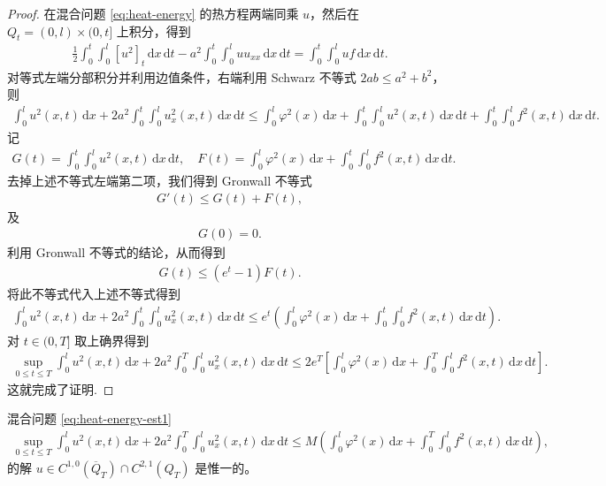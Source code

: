 \documentclass[../../main.tex]{subfiles}%
\begin{document}
\begin{proof}
在混合问题 \eqref{eq:heat-energy} 的热方程两端同乘 $u$，然后在 $Q_t=(0,l)\times(0,t]$ 上积分，得到
\begin{align*}
\frac{1}{2}\int_0^t\int_0^l [u^2]_t\,\mathrm{d}x\,\mathrm{d}t-a^2\int_0^t\int_0^l u u_{xx}\,\mathrm{d}x\,\mathrm{d}t=\int_0^t\int_0^l uf\,\mathrm{d}x\,\mathrm{d}t.
\end{align*}
对等式左端分部积分并利用边值条件，右端利用 Schwarz 不等式 $2ab\leqslant a^2+b^2$，则
\begin{align*}
\int_0^l u^2(x,t)\,\mathrm{d}x+2a^2\int_0^t\int_0^l u_x^2(x,t)\,\mathrm{d}x\,\mathrm{d}t
\leqslant \int_0^l\varphi^2(x)\,\mathrm{d}x+\int_0^t\int_0^l u^2(x,t)\,\mathrm{d}x\,\mathrm{d}t+\int_0^t\int_0^l f^2(x,t)\,\mathrm{d}x\,\mathrm{d}t.
\end{align*}
记
\begin{align*}
G(t)=\int_0^t\int_0^l u^2(x,t)\,\mathrm{d}x\,\mathrm{d}t,\quad
F(t)=\int_0^l\varphi^2(x)\,\mathrm{d}x+\int_0^t\int_0^l f^2(x,t)\,\mathrm{d}x\,\mathrm{d}t.
\end{align*}
去掉上述不等式左端第二项，我们得到 Gronwall 不等式
\begin{align*}
G'(t)\leqslant G(t)+F(t),
\end{align*}
及
\begin{align*}
G(0)=0.
\end{align*}
利用 Gronwall 不等式的结论，从而得到
\begin{align*}
G(t)\leqslant (e^t-1)F(t).
\end{align*}
将此不等式代入上述不等式得到
\begin{align*}
\int_0^l u^2(x,t)\,\mathrm{d}x+2a^2\int_0^t\int_0^l u_x^2(x,t)\,\mathrm{d}x\,\mathrm{d}t
\leqslant e^t\left(\int_0^l\varphi^2(x)\,\mathrm{d}x+\int_0^t\int_0^l f^2(x,t)\,\mathrm{d}x\,\mathrm{d}t\right).
\end{align*}
对 $t\in(0,T]$ 取上确界得到
\begin{align*}
\sup_{0\leqslant t\leqslant T}\int_0^l u^2(x,t)\,\mathrm{d}x+2a^2\int_0^T\int_0^l u_x^2(x,t)\,\mathrm{d}x\,\mathrm{d}t
\leqslant 2e^T\left[\int_0^l\varphi^2(x)\,\mathrm{d}x+\int_0^T\int_0^l f^2(x,t)\,\mathrm{d}x\,\mathrm{d}t\right].
\end{align*}
这就完成了证明.
\end{proof}

\begin{theorem}
混合问题 \eqref{eq:heat-energy-est1}
\begin{align}
\sup_{0\leqslant t\leqslant T}\int_0^l u^2(x,t)\,\mathrm{d}x+2a^2\int_0^T\int_0^l u_x^2(x,t)\,\mathrm{d}x\,\mathrm{d}t
\leqslant M\left(\int_0^l\varphi^2(x)\,\mathrm{d}x+\int_0^T\int_0^l f^2(x,t)\,\mathrm{d}x\,\mathrm{d}t\right), \label{eq:heat-energy-est1}
\end{align}
的解 $u\in C^{1,0}(\overline{Q}_T)\cap C^{2,1}(Q_T)$ 是惟一的。
\end{theorem}
\end{document}
